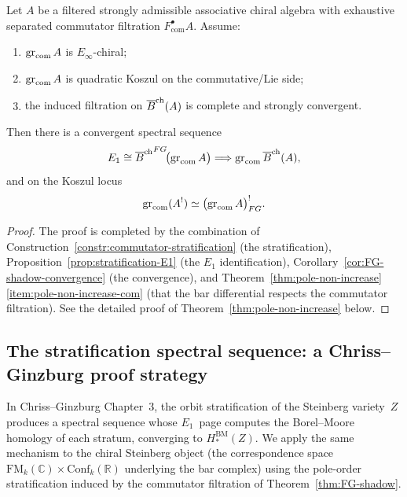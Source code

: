 \begin{theorem}
\label{thm:FG-shadow}
Let $A$ be a filtered strongly admissible associative chiral algebra with exhaustive separated
commutator filtration $F_{\mathrm{com}}^\bullet A$. Assume:
\begin{enumerate}[label=(\alph*)]
\item $\operatorname{gr}_{\mathrm{com}}A$ is $E_\infty$-chiral;
\item $\operatorname{gr}_{\mathrm{com}}A$ is quadratic Koszul on the commutative/Lie side;
\item the induced filtration on $\overline{B}^{\mathrm{ch}}(A)$ is complete and strongly convergent.
\end{enumerate}
Then there is a convergent spectral sequence
\[
E_1\cong {\overline{B}^{\mathrm{ch}}}^{FG}\!\bigl(\operatorname{gr}_{\mathrm{com}}A\bigr)
\Longrightarrow
\operatorname{gr}_{\mathrm{com}}\overline{B}^{\mathrm{ch}}(A),
\]
and on the Koszul locus
\[
\operatorname{gr}_{\mathrm{com}}(A^!)\simeq \bigl(\operatorname{gr}_{\mathrm{com}}A\bigr)^!_{FG}.
\]
\end{theorem}

\begin{proof}
The proof is completed by the combination of
Construction~\ref{constr:commutator-stratification} (the stratification),
Proposition~\ref{prop:stratification-E1} (the $E_1$ identification),
Corollary~\ref{cor:FG-shadow-convergence} (the convergence), and
Theorem~\ref{thm:pole-non-increase}\ref{item:pole-non-increase-com} (that the
bar differential respects the commutator filtration). See the detailed proof
of Theorem~\ref{thm:pole-non-increase} below.
\end{proof}

\subsection{The stratification spectral sequence: a Chriss--Ginzburg proof strategy}
\label{subsec:CG-stratification}

\providecommand{\BM}{\mathrm{BM}}
\providecommand{\FM}{\mathrm{FM}}
\providecommand{\Conf}{\mathrm{Conf}}

In Chriss--Ginzburg \cite{chriss-ginzburg} Chapter~3, the orbit stratification
of the Steinberg variety~$Z$ produces a spectral sequence whose $E_1$~page
computes the Borel--Moore homology of each stratum, converging to
$H_*^{\BM}(Z)$. We apply the same mechanism to the chiral Steinberg
object (the correspondence space $\FM_k(\mathbb{C})\times\Conf_k(\mathbb{R})$
underlying the bar complex) using the pole-order stratification induced by
the commutator filtration of Theorem~\ref{thm:FG-shadow}.

